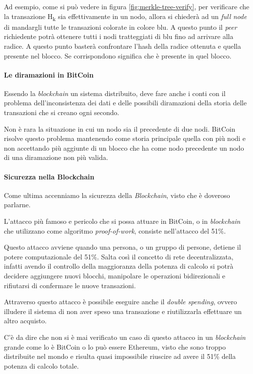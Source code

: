 Ad esempio, come si può vedere in figura \ref{fig:merkle-tree-verify}, per verificare che la transazione H\textsubscript{k} sia effettivamente in un nodo, allora si chiederà ad un \textit{full node} di mandargli tutte le transazioni colorate in colore blu. A questo punto il \textit{peer} richiedente potrà ottenere tutti i nodi tratteggiati di blu fino ad arrivare alla radice. A questo punto basterà confrontare l'hash della radice ottenuta e quella presente nel blocco. Se corrispondono significa che è presente in quel blocco. 

\paragraph{Le diramazioni in BitCoin}
Essendo la \textit{blockchain} un sistema distribuito, deve fare anche i conti con il problema dell'inconsistenza dei dati e delle possibili diramazioni della storia delle transazioni che si creano ogni secondo.

Non è rara la situazione in cui un nodo sia il precedente di due nodi. BitCoin risolve questo problema mantenendo come storia principale quella con più nodi e non accettando più aggiunte di un blocco che ha come nodo precedente un nodo di una diramazione non più valida.

\paragraph{Sicurezza nella Blockchain}
Come ultima accenniamo la sicurezza della \textit{Blockchain}, visto che è doveroso parlarne.

L'attacco più famoso e pericolo che si possa attuare in BitCoin, o in \textit{blockchain} che utilizzano come algoritmo \textit{proof-of-work}, consiste nell'attacco del 51\%.

Questo attacco avviene quando una persona, o un gruppo di persone, detiene il potere computazionale del 51\%. Salta così il concetto di rete decentralizzata, infatti avendo il controllo della maggioranza della potenza di calcolo si potrà decidere aggiungere nuovi blocchi, manipolare le operazioni bidirezionali e rifiutarsi di confermare le nuove transazioni. 

Attraverso questo attacco è possibile eseguire anche il \textit{double spending}, ovvero illudere il sistema di non aver speso una transazione e riutilizzarla effettuare un altro acquisto.

C'è da dire che non si è mai verificato un caso di questo attacco in un \textit{blockchain} grande come lo è BitCoin o lo può essere Ethereum, visto che sono troppo distribuite nel mondo e risulta quasi impossibile riuscire ad avere il 51\% della potenza di calcolo totale.  

